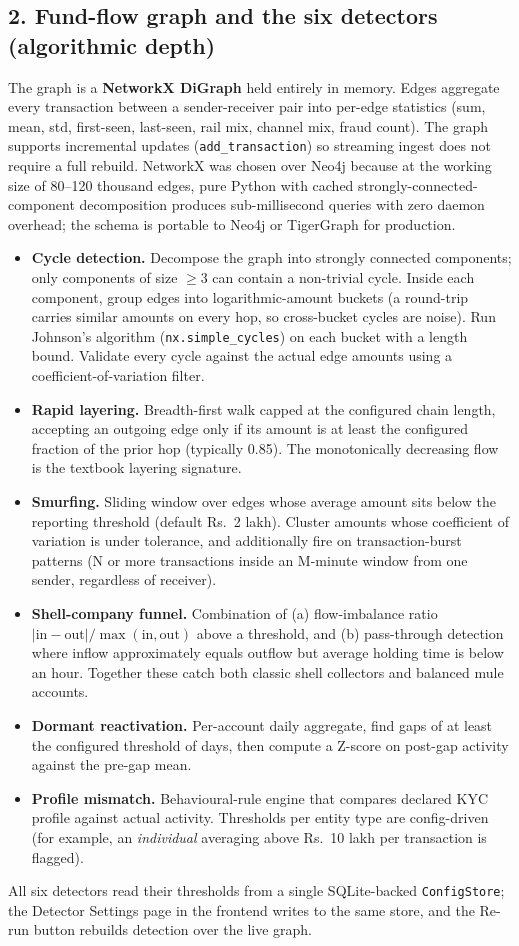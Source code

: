 \documentclass[10pt,a4paper]{article}
\begin{document}
\subsection*{2. Fund-flow graph and the six detectors (algorithmic depth)}
The graph is a \textbf{NetworkX DiGraph} held entirely in memory. Edges aggregate every transaction between a sender-receiver pair into per-edge statistics (sum, mean, std, first-seen, last-seen, rail mix, channel mix, fraud count). The graph supports incremental updates (\texttt{add\_transaction}) so streaming ingest does not require a full rebuild. NetworkX was chosen over Neo4j because at the working size of 80--120 thousand edges, pure Python with cached strongly-connected-component decomposition produces sub-millisecond queries with zero daemon overhead; the schema is portable to Neo4j or TigerGraph for production.
\begin{itemize}
  \item \textbf{Cycle detection.} Decompose the graph into strongly connected components; only components of size $\geq 3$ can contain a non-trivial cycle. Inside each component, group edges into logarithmic-amount buckets (a round-trip carries similar amounts on every hop, so cross-bucket cycles are noise). Run Johnson's algorithm (\texttt{nx.simple\_cycles}) on each bucket with a length bound. Validate every cycle against the actual edge amounts using a coefficient-of-variation filter.
  \item \textbf{Rapid layering.} Breadth-first walk capped at the configured chain length, accepting an outgoing edge only if its amount is at least the configured fraction of the prior hop (typically 0.85). The monotonically decreasing flow is the textbook layering signature.
  \item \textbf{Smurfing.} Sliding window over edges whose average amount sits below the reporting threshold (default Rs.~2 lakh). Cluster amounts whose coefficient of variation is under tolerance, and additionally fire on transaction-burst patterns (N or more transactions inside an M-minute window from one sender, regardless of receiver).
  \item \textbf{Shell-company funnel.} Combination of (a) flow-imbalance ratio $|\text{in} - \text{out}| / \max(\text{in}, \text{out})$ above a threshold, and (b) pass-through detection where inflow approximately equals outflow but average holding time is below an hour. Together these catch both classic shell collectors and balanced mule accounts.
  \item \textbf{Dormant reactivation.} Per-account daily aggregate, find gaps of at least the configured threshold of days, then compute a Z-score on post-gap activity against the pre-gap mean.
  \item \textbf{Profile mismatch.} Behavioural-rule engine that compares declared KYC profile against actual activity. Thresholds per entity type are config-driven (for example, an \emph{individual} averaging above Rs.~10 lakh per transaction is flagged).
\end{itemize}
All six detectors read their thresholds from a single SQLite-backed \texttt{ConfigStore}; the Detector Settings page in the frontend writes to the same store, and the Re-run button rebuilds detection over the live graph.
\end{document}
